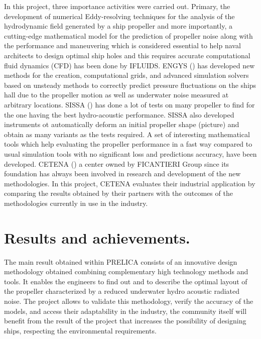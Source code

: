 \documentclass[10pt,a4paper,twoside]{article}
\begin{document}
In this project, three importance activities were carried out. Primary, the development of numerical Eddy-resolving techniques for the analysis of the hydrodynamic field generated by a ship propeller and more importantly, a cutting-edge mathematical model for the prediction of propeller noise along with the performance and maneuvering which is considered essential to help naval architects to design optimal ship holes and this requires accurate computational fluid dynamics (CFD) has been done by IFLUIDS. ENGYS () has developed new methods for the creation, computational grids, and advanced simulation solvers based on unsteady methods to correctly predict pressure fluctuations on the ships hall due to the propeller motion as well as underwater noise measured at arbitrary locations. SISSA () has done a lot of tests on many propeller to find for the one having the best hydro-acoustic performance. SISSA also developed instruments ot automatically deform an initial propeller shape (picture) and obtain as many variants as the tests required. A set of interesting mathematical tools which help evaluating the propeller performance in a fast way compared to usual simulation tools with no significant loss and predictions accuracy, have been developed. CETENA () a center owned by FICANTIERI Group since its foundation has always been involved in research and development of the new methodologies. In this project, CETENA evaluates their industrial application by comparing the results obtained by their partners with the outcomes of the methodologies currently in use in the industry. 

\section{Results and achievements.}

The main result obtained within PRELICA consists of an innovative design methodology obtained combining complementary high technology methods and tools.  It enables the engineers to find out and to describe the optimal layout of the propeller characterized by a reduced underwater hydro acoustic radiated noise. The project allows to validate this methodology, verify the accuracy of the models, and access their adaptability in the industry, the community itself will benefit from the result of the project that increases the possibility of designing ships, respecting the environmental requirements.





\end{document}
